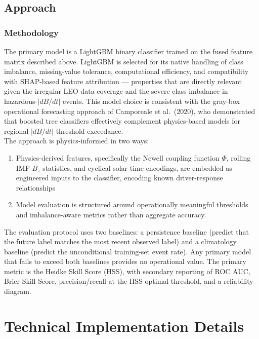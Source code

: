 \documentclass{article}
\begin{document}
\subsection*{Approach}

\subsubsection*{Methodology}
The primary model is a LightGBM binary classifier trained on the fused feature matrix described above. LightGBM is selected for its native handling of class imbalance, missing-value tolerance, computational efficiency, and compatibility with SHAP-based feature attribution — properties that are directly relevant given the irregular LEO data coverage and the severe class imbalance in hazardous-$|dB/dt|$ events. This model choice is consistent with the gray-box operational forecasting approach of Camporeale et al.\ (2020), who demonstrated that boosted tree classifiers effectively complement physics-based models for regional $|dB/dt|$ threshold exceedance.\\

\noindent The approach is physics-informed in two ways: \\
\begin{enumerate}
  \item Physics-derived features, specifically the Newell coupling function $\Phi$, rolling IMF $B_z$ statistics, and cyclical solar time encodings, are embedded as engineered inputs to the classifier, encoding known driver-response relationships
  \item Model evaluation is structured around operationally meaningful thresholds and imbalance-aware metrics rather than aggregate accuracy.
\end{enumerate}

\noindent The evaluation protocol uses two baselines: a persistence baseline (predict that the future label matches the most recent observed label) and a climatology baseline (predict the unconditional training-set event rate). Any primary model that fails to exceed both baselines provides no operational value. The primary metric is the Heidke Skill Score (HSS), with secondary reporting of ROC AUC, Brier Skill Score, precision/recall at the HSS-optimal threshold, and a reliability diagram.

\section*{Technical Implementation Details}
\end{document}
